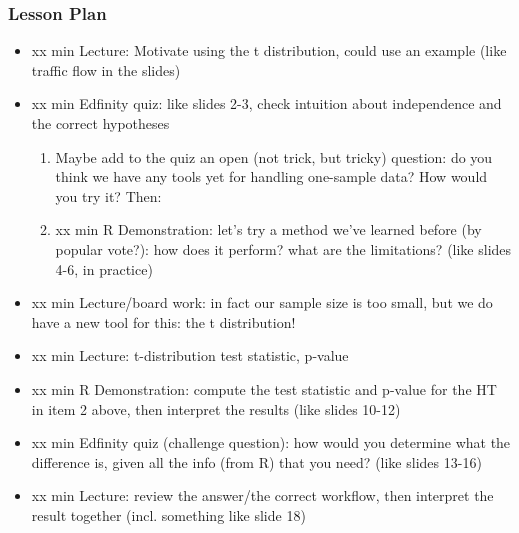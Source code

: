 \begin{frame}
    \frametitle{Lesson Plan}
    \begin{itemize}
        \item xx min Lecture: Motivate using the t distribution, could use an example (like traffic flow in the slides)
        \item xx min Edfinity quiz: like slides 2-3, check intuition about independence and the correct hypotheses
        \begin{enumerate}
            \item Maybe add to the quiz an open (not trick, but tricky) question: do you think we have any tools yet for handling one-sample data? How would you try it? Then:
            \item xx min R Demonstration: let's try a method we've learned before (by popular vote?): how does it perform? what are the limitations? (like slides 4-6, in practice)
        \end{enumerate}
        \item xx min Lecture/board work: in fact our sample size is too small, but we do have a new tool for this: the t distribution!
        \item xx min Lecture: t-distribution test statistic, p-value
        \item xx min R Demonstration: compute the test statistic and p-value for the HT in item 2 above, then interpret the results (like slides 10-12)
        \item xx min Edfinity quiz (challenge question): how would you determine what the difference is, given all the info (from R) that you need? (like slides 13-16)
        \item xx min Lecture: review the answer/the correct workflow, then interpret the result together (incl. something like slide 18)
    \end{itemize}
\end{frame}
            
